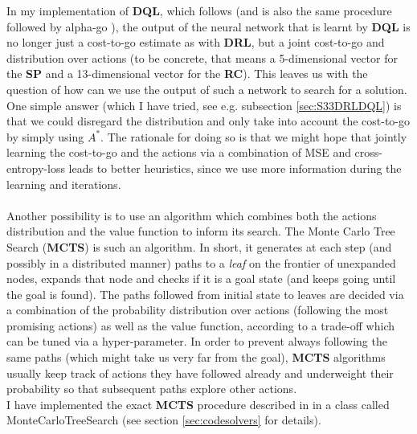 In my implementation of \textbf{DQL}, which follows \cite{https://doi.org/10.48550/arxiv.1805.07470} (and is also the same procedure followed by alpha-go \cite{AlphaGo}), the output of the neural network that is learnt by \textbf{DQL} is no longer just a cost-to-go estimate as with \textbf{DRL}, but a joint cost-to-go and distribution over actions (to be concrete, that means a 5-dimensional vector for the \textbf{SP} and a 13-dimensional vector for the \textbf{RC}). This leaves us with the question of how can we use the output of such a network to search for a solution. One simple answer (which I have tried, see e.g. subsection \ref{sec:S33DRLDQL}) is that we could disregard the distribution and only take into account the cost-to-go by simply using $A^{*}$. The rationale for doing so is that we might hope that jointly learning the cost-to-go and the actions via a combination of MSE and cross-entropy-loss leads to better heuristics, since we use more information during the learning and iterations.
\\
\\
Another possibility is to use an algorithm which combines both the actions distribution and the value function to inform its search. The Monte Carlo Tree Search (\textbf{MCTS}) is such an algorithm. In short, it generates at each step (and possibly in a distributed manner) paths to a \textit{leaf} on the frontier of unexpanded nodes, expands that node and checks if it is a goal state (and keeps going until the goal is found). The paths followed from initial state to leaves are decided via a combination of the probability distribution over actions (following the most promising actions) as well as the value function, according to a trade-off which can be tuned via a hyper-parameter. In order to prevent always following the same paths (which might take us very far from the goal), \textbf{MCTS} algorithms usually keep track of actions they have followed already and underweight their probability so that subsequent paths explore other actions.
\\
I have implemented the exact \textbf{MCTS} procedure described in \cite{https://doi.org/10.48550/arxiv.1805.07470} in a class called MonteCarloTreeSearch (see section \ref{sec:codesolvers} for details).




































